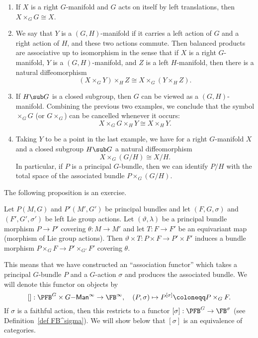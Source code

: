 \begin{example}
    \begin{enumerate}
        \item If $X$ is a right $G$-manifold and $G$ acts on itself by left translations, then $X\times_G G\cong X$.
        \item We say that $Y$ is a $(G,H)$-manifold if it carries a left action of $G$ and a right action of $H$, and these two actions commute. Then balanced products are associative up to isomorphism in the sense that if $X$ is a right $G$-manifold, $Y$ is a $(G,H)$-manifold, and $Z$ is a left $H$-manifold, then there is a natural diffeomorphism
        \[(X\times_G Y)\times_H Z\cong X\times_G (Y\times_H Z).\]
        \item If $H\sub G$ is a closed subgroup, then $G$ can be viewed as a $(G,H)$-manifold. Combining the previous two examples, we conclude that the symbol $\times_G G$ (or $G\times_G$) can be cancelled whenever it occurs:
        \[X\times_G G\times_H Y\cong X\times_H Y.\]
        \item Taking $Y$ to be a point in the last example, we have for a right $G$-manifold $X$ and a closed subgroup $H\sub G$ a natural diffeomorphism
        \[X\times_G (G\slash H)\cong X\slash H.\]
        In particular, if $P$ is a principal $G$-bundle, then we can identify $P\slash H$ with the total space of the associated bundle $P\times_G (G\slash H)$.
    \end{enumerate}
\end{example}

 The following proposition is an exercise.
\begin{prop}[{{\cite[Prop.~1.2.2]{RS2}}}]\label{prop 1.2.2 RS2}
    Let $P(M,G)$ and $P'(M',G')$ be principal bundles and let $(F,G,\sigma)$ and $(F',G',\sigma')$ be left Lie group actions. Let $(\vartheta,\lambda)$ be a principal bundle morphism $P\to P'$ covering $\theta:M\to M'$ and let $T:F\to F'$ be an equivariant map (morphism of Lie group actions). Then $\vartheta\times T:P\times F\to P'\times F'$ induces a bundle morphism $P\times_G F\to P'\times_{G'} F'$ covering $\theta$.
\end{prop}

This means that we have constructed an ``association functor'' which takes a principal $G$-bundle $P$ and a $G$-action $\sigma$ and produces the associated bundle. We will denote this functor on objects by
\[[]:\PFB^G\times G\mathsf{-Man}^\infty \to \FB^\infty,\quad (P,\sigma)\mapsto P^{[\sigma]}\coloneqq P\times_G F.\]
If $\sigma$ is a faithful action, then this restricts to a functor
$[\sigma]:\PFB^G\to \FB^\sigma$ (see Definition~\ref{def FB^sigma}). We will show below that $[\sigma]$ is an equivalence of categories.


